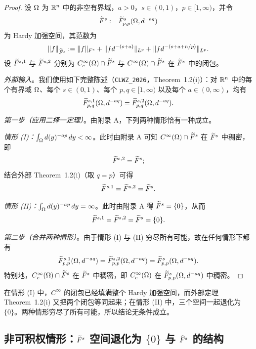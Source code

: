 \begin{proof}
设 $\Omega$ 为 $\mathbb{R}^n$ 中的非空有界域，$a>0$，$s\in(0,1)$，$p\in[1,\infty)$，并令
\[
  \widetilde F^s:=\widetilde F^s_{p,p}(\Omega,d^{-aq})
\]
为 Hardy 加强空间，其范数为
\[
  \|f\|_{\widetilde F^s}:=\|f\|_{F^s}+\|f d^{-(s+a)}\|_{L^p}+\|f d^{-(s+a+n/p)}\|_{L^p} .
\]
设 $\widetilde F^{s,1}$ 与 $\widetilde F^{s,2}$ 分别为 $C_c^\infty(\Omega)\cap\widetilde F^s$ 与 $C^\infty(\Omega)\cap\widetilde F^s$ 在 $\widetilde F^s$ 中的闭包。

\emph{外部输入}。我们使用如下完整陈述（\texttt{CLWZ\_2026}，Theorem~1.2(i)）：对 $\mathbb{R}^n$ 中的每个有界域 $\Omega$、每个 $s\in(0,1)$、每个 $p,q\in[1,\infty)$ 以及每个 $a\in(0,\infty)$，均有
\[
  \widetilde F^{s,1}_{p,q}(\Omega,d^{-aq})=\widetilde F^{s,2}_{p,q}(\Omega,d^{-aq}) .
\]

\emph{第一步（应用二择一定理）}。由附录 A，下列两种情形恰有一种成立。

\emph{情形 (I)：$\int_\Omega d(y)^{-ap}\,dy<\infty$}。此时由附录 A 可知 $C^\infty(\Omega)\cap\widetilde F^s$ 在 $\widetilde F^s$ 中稠密，即
\[
  \widetilde F^{s,2}=\widetilde F^s ;
\]
结合外部 Theorem~1.2(i)（取 $q=p$）可得
\[
  \widetilde F^{s,1}=\widetilde F^{s,2}=\widetilde F^s .
\]

\emph{情形 (II)：$\int_\Omega d(y)^{-ap}\,dy=\infty$}。此时由附录 A 得 $\widetilde F^s=\{0\}$，从而
\[
  \widetilde F^{s,1}=\widetilde F^{s,2}=\widetilde F^s=\{0\} .
\]

\emph{第二步（合并两种情形）}。由于情形 (I) 与 (II) 穷尽所有可能，故在任何情形下都有
\[
  \widetilde F^{s,1}_{p,p}(\Omega,d^{-aq})
  =\widetilde F^{s,2}_{p,p}(\Omega,d^{-aq})
  =\widetilde F^s_{p,p}(\Omega,d^{-aq}) .
\]
特别地，$C_c^\infty(\Omega)\cap\widetilde F^s$ 在 $\widetilde F^s$ 中稠密，即 $C_c^\infty(\Omega)$ 在 $\widetilde F^s_{p,p}(\Omega,d^{-aq})$ 中稠密。
\end{proof}

\begin{remark}[直觉]
在情形 (I) 中，$C^\infty$ 的闭包已经填满整个 Hardy 加强空间，而外部定理 Theorem~1.2(i) 又把两个闭包等同起来；在情形 (II) 中，三个空间一起退化为 $\{0\}$。两种情形穷尽了所有可能，所以结论无条件成立。
\end{remark}

\subsection{非可积权情形：\texorpdfstring{$\widetilde F^s$}{tilde-F-s} 空间退化为 \texorpdfstring{$\{0\}$}{\{0\}} 与 \texorpdfstring{$\widehat F^s$}{hat-F-s} 的结构}

